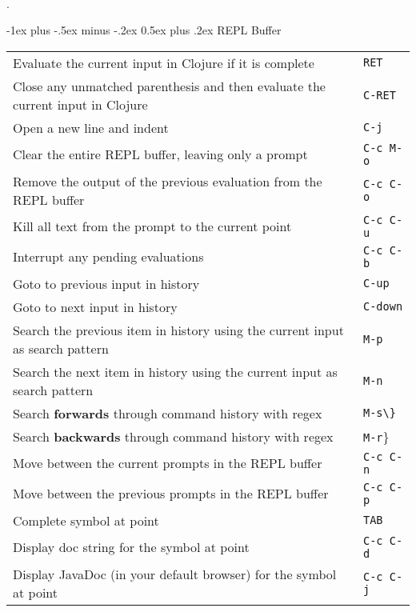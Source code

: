 \documentclass[12pt,landscape]{article}
\makeatletter
\renewcommand{\section}{\@startsection{section}{1}{0mm}%
                                {-1ex plus -.5ex minus -.2ex}%
                                {0.5ex plus .2ex}%
                                {\normalfont\large\bfseries}}
\makeatother
\begin{document}
\begin{multicols}{3}
\begin{tabular}{p{6cm}p{1cm}}
\end{tabular}


\begin{center}
	\\
\end{center}.

\section{REPL Buffer}
\begin{tabular}{p{6cm}p{1cm}} %

  Evaluate the current input in Clojure if it is complete & \verb!RET! \\
  Close any unmatched parenthesis and then evaluate the current input in Clojure & \verb!C-RET! \\
  Open a new line and indent & \verb!C-j! \\
  Clear the entire REPL buffer, leaving only a prompt & \verb!C-c M-o! \\
  Remove the output of the previous evaluation from the REPL buffer & \verb!C-c C-o! \\
  Kill all text from the prompt to the current point & \verb!C-c C-u! \\
  Interrupt any pending evaluations & \verb!C-c C-b! \\
  Goto to previous input in history & \verb!C-up! \\
  Goto to next input in history & \verb!C-down! \\
  Search the previous item in history using the current input as search pattern & \verb!M-p! \\
  Search the next item in history using the current input as search pattern & \verb!M-n! \\
  Search {\bf forwards } through command history with regex & \verb!M-s\}! \\
  Search {\bf backwards} through command history with regex & \verb!M-r!\} \\
  Move between the current prompts in the REPL buffer & \verb!C-c C-n! \\
  Move between the previous prompts in the REPL buffer & \verb!C-c C-p! \\
  Complete symbol at point & \verb!TAB! \\
  Display doc string for the symbol at point & \verb!C-c C-d! \\
  Display JavaDoc (in your default browser) for the symbol at point & \verb!C-c C-j! \\
\end{tabular}





\end{multicols}
\end{document}
